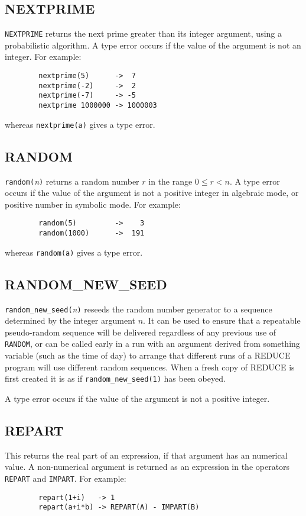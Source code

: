 \subsection{NEXTPRIME}

{\tt NEXTPRIME} returns the next prime greater than its integer argument,
using a probabilistic algorithm.  A type error occurs if the value of the
argument is not an integer.  For example:
\begin{verbatim}
        nextprime(5)      ->  7
        nextprime(-2)     ->  2
        nextprime(-7)     -> -5
        nextprime 1000000 -> 1000003
\end{verbatim}
whereas {\tt nextprime(a)} gives a type error.

\subsection{RANDOM}

{\tt random(}{\em n\/}{\tt)} returns a random number $r$ in the range $0
\leq r < n$.  A type error occurs if the value of the argument is not a
positive integer in algebraic mode, or positive number in symbolic mode.
For example:
\begin{verbatim}
        random(5)         ->    3
        random(1000)      ->  191
\end{verbatim}
whereas {\tt random(a)} gives a type error.

\subsection{RANDOM\_NEW\_SEED}

{\tt random\_new\_seed(}{\em n\/}{\tt)} reseeds the random number generator
to a sequence determined by the integer argument $n$.  It can be used to
ensure that a repeatable pseudo-random sequence will be delivered
regardless of any previous use of {\tt RANDOM}, or can be called early in
a run with an argument derived from something variable (such as the time
of day) to arrange that different runs of a REDUCE program will use
different random sequences.  When a fresh copy of REDUCE is first created
it is as if {\tt random\_new\_seed(1)} has been obeyed.

A type error occurs if the value of the argument is not a positive integer.

\subsection{REPART}
This returns the real part of an expression, if that argument has an
numerical value.  A non-numerical argument is returned as an expression in
the operators {\tt REPART} and {\tt IMPART}.  For example:
\begin{verbatim}
        repart(1+i)   -> 1
        repart(a+i*b) -> REPART(A) - IMPART(B)
\end{verbatim}

